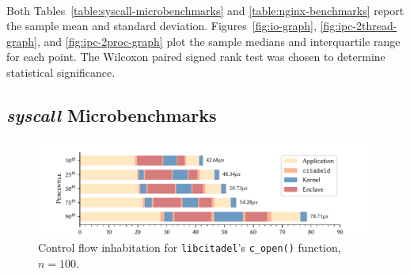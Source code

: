 \paragraph{} Both Tables~\ref{table:syscall-microbenchmarks} and \ref{table:nginx-benchmarks} report the sample mean and standard deviation. Figures~\ref{fig:io-graph}, \ref{fig:ipc-2thread-graph}, and \ref{fig:ipc-2proc-graph} plot the sample medians and interquartile range for each point. The Wilcoxon paired signed rank test was chosen to determine statistical significance.~\cite{10.2307/3001968}

\subsection{\textit{syscall} Microbenchmarks}
\label{sec:syscall-microbenchmarks}

\begin{figure}[]
    \centering
    \includegraphics[width=\linewidth]{figures/graphs/open-anatomy.pdf}
    \vspace{-5mm}
    \caption{Control flow inhabitation for \texttt{libcitadel}'s \texttt{c\_open()} function, $n=100$.}
    \label{fig:open-anatomy}
\end{figure}


